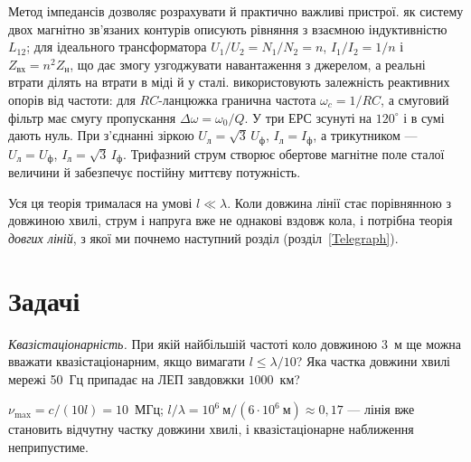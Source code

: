 Метод імпедансів дозволяє розрахувати й практично важливі пристрої.  як систему двох магнітно зв'язаних контурів описують рівняння з взаємною індуктивністю $L_{12}$; для ідеального трансформатора $U_1/U_2 = N_1/N_2 = n$, $I_1/I_2 = 1/n$ і $Z_\text{вх} = n^2Z_\text{н}$, що дає змогу узгоджувати навантаження з джерелом, а реальні втрати ділять на втрати в міді й у сталі.  використовують залежність реактивних опорів від частоти: для $RC$-ланцюжка гранична частота $\omega_c = 1/RC$, а смуговий фільтр має смугу пропускання $\Delta\omega = \omega_0/Q$. У  три ЕРС зсунуті на $120^\circ$ і в сумі дають нуль. При з'єднанні зіркою $U_\text{л} = \sqrt3\,U_\text{ф}$, $I_\text{л} = I_\text{ф}$, а трикутником --- $U_\text{л} = U_\text{ф}$, $I_\text{л} = \sqrt3\,I_\text{ф}$. Трифазний струм створює обертове магнітне поле сталої величини й забезпечує постійну миттєву потужність.

Уся ця теорія трималася на умові $l \ll \lambda$. Коли довжина лінії стає порівнянною з довжиною хвилі, струм і напруга вже не однакові вздовж кола, і потрібна теорія \emph{довгих ліній}, з якої ми почнемо наступний розділ (розділ~\ref{Telegraph}).


\section*{Задачі}

\begingroup
{}

\begin{problem}\label{prb:QuasiStationarity}
	\emph{Квазістаціонарність.} При якій найбільшій частоті коло довжиною $3$~м ще можна вважати квазістаціонарним, якщо вимагати $l\leqslant\lambda/10$? Яка частка довжини хвилі мережі 50~Гц припадає на ЛЕП завдовжки $1000$~км?
	\begin{solution}
		$\nu_{\max}=c/(10l)=10$~МГц; $l/\lambda=10^{6}\ \text{м}/(6\cdot10^{6}\ \text{м})\approx0{,}17$ --- лінія вже становить відчутну частку довжини хвилі, і квазістаціонарне наближення неприпустиме.
	\end{solution}
\end{problem}

